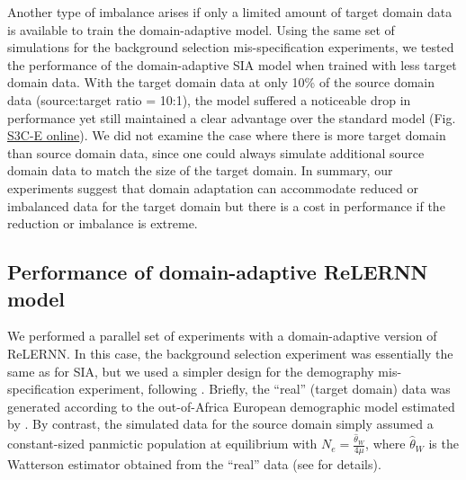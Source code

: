 Another type of imbalance arises if only a limited amount of target domain data is available to train the domain-adaptive model. Using the same set of simulations for the background selection mis-specification experiments, we tested the performance of the domain-adaptive \ac{SIA} model when trained with less target domain data. With the target domain data at only 10\% of the source domain data (source:target ratio = 10:1), the model suffered a noticeable drop in performance yet still maintained a clear advantage over the standard model (Fig. \href{https://journals.plos.org/plosgenetics/article?id=10.1371/journal.pgen.1011032\#sec018}{S3C-E online}). We did not examine the case where there is more target domain than source domain data, since one could always simulate additional source domain data to match the size of the target domain. In summary, our experiments suggest that domain adaptation can accommodate reduced or imbalanced data for the target domain but there is a cost in performance if the reduction or imbalance is extreme.

\subsection{Performance of domain-adaptive ReLERNN model}
We performed a parallel set of experiments with a domain-adaptive version of ReLERNN. In this case, the background selection experiment was essentially the same as for \ac{SIA}, but we used a simpler design for the demography mis-specification experiment, following \cite{adrion_predicting_2020}. Briefly, the “real” (target domain) data was generated according to the out-of-Africa European demographic model estimated by \cite{tennessen_evolution_2012}. By contrast, the simulated data for the source domain simply assumed a constant-sized panmictic population at equilibrium with $N_e=\frac{\hat{\theta}_W}{4\mu}$, where  $\hat{\theta}_W$ is the Watterson estimator obtained from the “real” data (see  for details).

